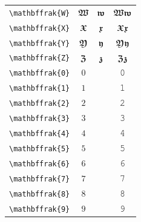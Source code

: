\documentclass[12pt,a4paper]{article}
\begin{document}
\begin{longtable}{|c|c|c|c|}
\verb|\mathbffrak{W}| & $\mathbffrak{W}$ & $\mathbffrak{w}$ & $ 𝖂 𝖜 $ \\
\verb|\mathbffrak{X}| & $\mathbffrak{X}$ & $\mathbffrak{x}$ & $ 𝖃 𝖝 $ \\
\verb|\mathbffrak{Y}| & $\mathbffrak{Y}$ & $\mathbffrak{y}$ & $ 𝖄 𝖞 $ \\
\verb|\mathbffrak{Z}| & $\mathbffrak{Z}$ & $\mathbffrak{z}$ & $ 𝖅 𝖟 $ \\
\verb|\mathbffrak{0}| & $\mathbffrak{0}$ & & 𝟶 \\
\verb|\mathbffrak{1}| & $\mathbffrak{1}$ & & 𝟷 \\
\verb|\mathbffrak{2}| & $\mathbffrak{2}$ & & 𝟸 \\
\verb|\mathbffrak{3}| & $\mathbffrak{3}$ & & 𝟹 \\
\verb|\mathbffrak{4}| & $\mathbffrak{4}$ & & 𝟺 \\
\verb|\mathbffrak{5}| & $\mathbffrak{5}$ & & 𝟻 \\
\verb|\mathbffrak{6}| & $\mathbffrak{6}$ & & 𝟼 \\
\verb|\mathbffrak{7}| & $\mathbffrak{7}$ & & 𝟽 \\
\verb|\mathbffrak{8}| & $\mathbffrak{8}$ & & 𝟾 \\
\verb|\mathbffrak{9}| & $\mathbffrak{9}$ & & 𝟿 \\
\hline
\end{longtable}
\end{document}
